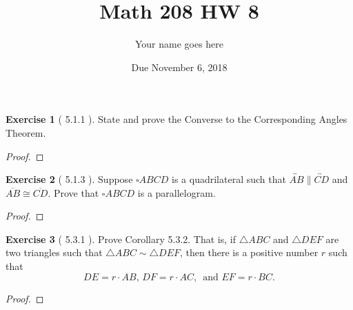 \documentclass[11pt]{article}		%
\title{Math 208 HW 8}
\author{Your name goes here}  %
\date{Due November 6, 2018}
\newcommand{\lin}[1]{\overleftrightarrow{#1}}
\newcommand{\seg}[1]{\overline{#1}}
\theoremstyle{definition}
\newtheorem*{exercise*}{Exercise}
\begin{document}
	\maketitle
	
	



\begin{exercise*}[ 5.1.1  ]
State and prove the Converse to the Corresponding Angles Theorem.
	
\end{exercise*}

\begin{proof} 
			
\end{proof}
	

\vspace{1in}



	
\begin{exercise*}[ 5.1.3   ]
Suppose $\square ABCD$ is a quadrilateral such that $\lin{AB} \parallel \lin{CD}$ and $\seg{AB} \cong \seg{CD}$.  Prove that $\square ABCD$ is a parallelogram.
	
\end{exercise*}

\begin{proof} 
	
\end{proof}



\vspace{1in}




\begin{exercise*}[ 5.3.1   ]
Prove Corollary 5.3.2.  That is, if $\triangle ABC$ and $\triangle DEF$ are two triangles such that $\triangle ABC \sim \triangle DEF$, then there is a positive number $r$ such that
\[DE = r \cdot AB, \, DF = r \cdot AC, \, \text{ and } EF = r \cdot BC.  \]	
	
\end{exercise*}

\begin{proof} 
	
\end{proof}


\vspace{1in}
\end{document}
